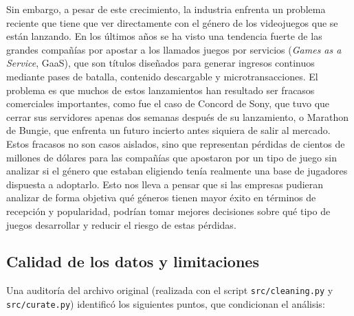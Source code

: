 \documentclass[letterpaper,11pt]{article}
\begin{document}
Sin embargo, a pesar de este crecimiento, la industria enfrenta un problema reciente que tiene que ver directamente con el género de los videojuegos que se están lanzando. En los últimos años se ha visto una tendencia fuerte de las grandes compañías por apostar a los llamados juegos por servicios (\textit{Games as a Service}, GaaS), que son títulos diseñados para generar ingresos continuos mediante pases de batalla, contenido descargable y microtransacciones. El problema es que muchos de estos lanzamientos han resultado ser fracasos comerciales importantes, como fue el caso de Concord de Sony, que tuvo que cerrar sus servidores apenas dos semanas después de su lanzamiento, o Marathon de Bungie, que enfrenta un futuro incierto antes siquiera de salir al mercado. Estos fracasos no son casos aislados, sino que representan pérdidas de cientos de millones de dólares para las compañías que apostaron por un tipo de juego sin analizar si el género que estaban eligiendo tenía realmente una base de jugadores dispuesta a adoptarlo. Esto nos lleva a pensar que si las empresas pudieran analizar de forma objetiva qué géneros tienen mayor éxito en términos de recepción y popularidad, podrían tomar mejores decisiones sobre qué tipo de juegos desarrollar y reducir el riesgo de estas pérdidas.

\subsection{Calidad de los datos y limitaciones}

Una auditoría del archivo original (realizada con el script \texttt{src/cleaning.py} y \texttt{src/curate.py}) identificó los siguientes puntos, que condicionan el análisis:
\end{document}
